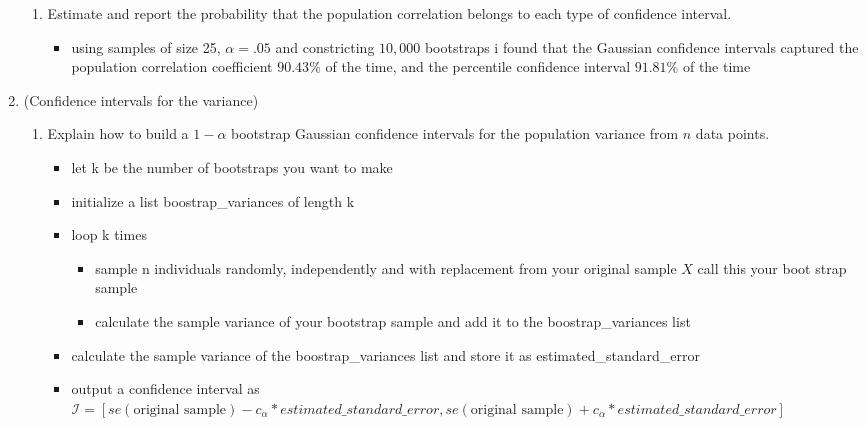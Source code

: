 \documentclass[12pt,twoside]{article}
\begin{document}
\begin{enumerate}
\begin{enumerate}
\item Estimate and report the probability that the population correlation belongs to each type of confidence interval.
\begin{itemize}
    \color{blue}
    \item using samples of size 25, $\alpha=.05$ and constricting $10,000$ bootstraps i found that the Gaussian confidence intervals captured the population correlation coefficient $90.43\%$ of the time, and the percentile confidence interval $91.81\%$ of the time 
\end{itemize}
\end{enumerate}
\newpage
\item (Confidence intervals for the variance) 
\begin{enumerate}
\item Explain how to build a $1-\alpha$ bootstrap Gaussian confidence intervals for the population variance from $n$ data points.
\begin{itemize}
    \color{blue}
    \item let k be the number of bootstraps you want to make 
    \item initialize a list boostrap\_variances of length k 
    \item loop k times
    \begin{itemize}
    \item sample n individuals randomly, independently and with replacement from your original sample $X$ call this your boot strap sample
    \item calculate the sample variance of your bootstrap sample and add it to the  boostrap\_variances list
        \end{itemize}
    \item calculate the sample variance of the boostrap\_variances list and store it as estimated\_standard\_error 
    \item output a confidence interval as\\ $\mathcal{I}=[se(\text{original sample})-c_{\alpha}*estimated\_standard\_error,se(\text{original sample})+c_{\alpha}*estimated\_standard\_error]$
\end{itemize}


\end{enumerate}
\end{enumerate}
\end{document}
